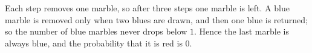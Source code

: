Each step removes one marble, so after three steps one marble is left. A blue marble is removed only when two blues are drawn, and then one blue is returned; so the number of blue marbles never drops below $1$. Hence the last marble is always blue, and the probability that it is red is $\boxed{0}$.

